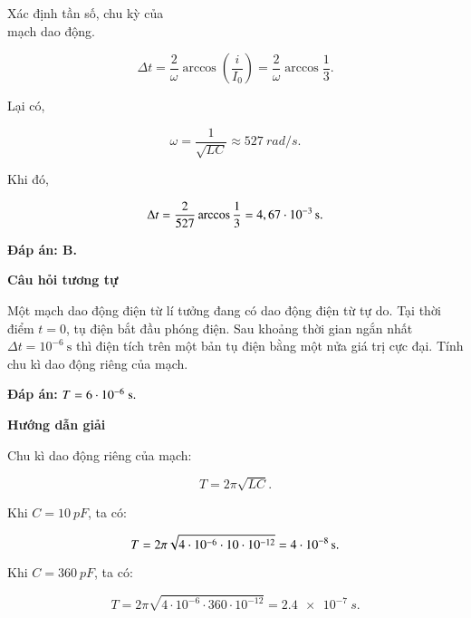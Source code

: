 \begin{dang}{Xác định tần số, chu kỳ của\\ mạch dao động.}
{		$$\Delta t=\dfrac{2}{\omega} \arccos \left(\dfrac{i}{I_{0}}\right)=\dfrac{2}{\omega} \arccos \dfrac{1}{3}.$$
		
		Lại có,
		
		$$\omega=\dfrac{1}{\sqrt{L C}} \approx \SI{527}{rad/s}.$$
		
		Khi đó,
		
		$$\Delta t=\dfrac{2}{527} \arccos \dfrac{1}{3}= \xsi{4,67\cdot10^{-3}}{s}.$$
		
		\textbf{Đáp án: B.}
		
		
		\begin{center}
			\textbf{Câu hỏi tương tự}
		\end{center}
		
		Một mạch dao động điện từ lí tưởng đang có dao động điện từ tự do. Tại thời điểm $t = 0$, tụ điện bắt đầu phóng điện. Sau khoảng thời gian ngắn nhất $\Delta t = 10^{-6}\ \text{s}$ thì điện tích trên một bản tụ điện bằng một nửa giá trị cực đại. Tính chu kì dao động riêng của mạch.
		
		\textbf{Đáp án:} $T = 6 \cdot 10^{-6}\ \text s.$
	}
	
	{	\begin{center}
			\textbf{Hướng dẫn giải}
		\end{center}
		
		Chu kì dao động riêng của mạch:
		
		$$T=2 \pi \sqrt{L C}.$$
		
		Khi $C=\SI{10}{pF}$, ta có:
		
		$$T=2 \pi \sqrt{4\cdot10^{-6} \cdot 10\cdot10^{-12}}= \xsi{4\cdot10^{-8}}{s}.$$
		
		Khi $C=\SI{360}{pF}$, ta có:
		
		$$T=2 \pi \sqrt{4\cdot10^{-6} \cdot 360\cdot10^{-12}}= \SI{2,4 e-7}{s}.$$
		
}
\end{dang}
